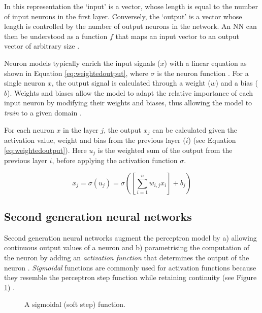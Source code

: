 \documentclass[report.tex]{subfiles}
\begin{document}
In this representation the `input' is a vector, whose
length is equal to the number of input neurons in the first layer.
Conversely, the `output' is a vector whose length
is controlled by the number of output neurons in the network.
An \gls{NN} can then be understood as a function $f$ that 
maps an input vector to an output vector of arbitrary size
\cite{Russel2007}.

Neuron models typically enrich the
input signals ($x$) with a linear equation as shown in Equation \ref{eq:weightedoutput},
where $\sigma$ is the neuron function
\cite{Schmidhuber2014, Russel2007}. 
For a single neuron $x$, the output signal is calculated through a weight ($w$)
and a bias ($b$). 
Weights and biases allow the model to adapt the relative importance of each
input neuron by modifying their weights and biases, thus allowing the
model to \textit{train} to a given domain \cite{Schmidhuber2014, Russel2007}.

For each neuron $x$ in the layer $j$, the output $x_j$ can be calculated given the activation value,
weight and bias from the previous layer ($i$) (see Equation
\ref{eq:weightedoutput}).
Here $u_j$ is the weighted sum of the output from the previous layer $i$, before
applying the activation function $\sigma$.

\begin{equation} \label{eq:weightedoutput}
x_j = \sigma(u_j) = \sigma\left(\left[\sum_{i=1}^n w_{i,j} x_i\right] + b_j \right)
\end{equation}

\subsection{Second generation neural networks}
Second generation neural networks augment the perceptron model by
a) allowing continuous output values of a neuron and b) parametrising
the computation of the neuron by adding an \textit{activation function}
 that determines the output of the neuron
\cite{Maass1997}.
\textit{Sigmoidal} functions are commonly used for activation functions
because they resemble the perceptron step function while 
retaining continuity (see Figure \ref{fig:sigmoid})
\cite{Maass1997}.

\begin{figure}
\centering
{}
\caption{A sigmoidal (soft step) function.}
\label{fig:sigmoid}
\end{figure}
\end{document}
